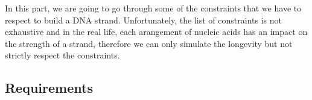 In this part, we are going to go through some of the constraints that we have to respect to build a DNA strand. Unfortunately, the list of constraints is not exhaustive and in the real life, each arangement of nucleic acids has an impact on the strength of a strand, therefore we can only simulate the longevity but not strictly respect the constraints. 

\tocontinue{}

\subsection{Requirements}

\tocontinue{}


